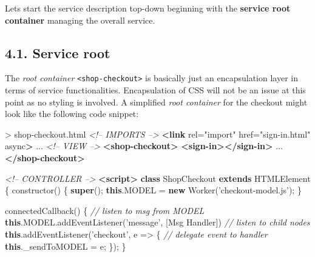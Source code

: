 \documentclass[]{article}
\newenvironment{Shaded}{}{}
\newcommand{\KeywordTok}[1]{\textcolor[rgb]{0.00,0.44,0.13}{\textbf{{#1}}}}
\newcommand{\StringTok}[1]{\textcolor[rgb]{0.25,0.44,0.63}{{#1}}}
\newcommand{\CommentTok}[1]{\textcolor[rgb]{0.38,0.63,0.69}{\textit{{#1}}}}
\newcommand{\OtherTok}[1]{\textcolor[rgb]{0.00,0.44,0.13}{{#1}}}
\newcommand{\VariableTok}[1]{\textcolor[rgb]{0.10,0.09,0.49}{{#1}}}
\newcommand{\OperatorTok}[1]{\textcolor[rgb]{0.40,0.40,0.40}{{#1}}}
\newcommand{\AttributeTok}[1]{\textcolor[rgb]{0.49,0.56,0.16}{{#1}}}
\newcommand{\NormalTok}[1]{{#1}}
\begin{document}
Lets start the service description top-down beginning with the
\textbf{service root container} managing the overall service.

\subsection{4.1. Service root}\label{service-root}

The \emph{root container}
\texttt{\textless{}shop-checkout\textgreater{}} is basically just an
encapsulation layer in terms of service functionalities. Encapsulation
of CSS will not be an issue at this point as no styling is involved. A
simplified \emph{root container} for the checkout might look like the
following code snippet:

\begin{Shaded}
\begin{Highlighting}[]
\NormalTok{> shop-checkout.html}
\CommentTok{<!-- IMPORTS -->}
\KeywordTok{<link}\OtherTok{ rel=}\StringTok{"import"}\OtherTok{ href=}\StringTok{"sign-in.html"}\OtherTok{ async}\KeywordTok{>}
\NormalTok{...}
\CommentTok{<!-- VIEW -->}
\KeywordTok{<shop-checkout>}
  \KeywordTok{<sign-in></sign-in>}
  \NormalTok{...}
\KeywordTok{</shop-checkout>}

\CommentTok{<!-- CONTROLLER -->}
\KeywordTok{<script>}
\KeywordTok{class} \NormalTok{ShopCheckout }\KeywordTok{extends} \NormalTok{HTMLElement }\OperatorTok{\{}
  \AttributeTok{constructor}\NormalTok{() }\OperatorTok{\{}
    \KeywordTok{super}\NormalTok{()}\OperatorTok{;}
    \KeywordTok{this}\NormalTok{.}\AttributeTok{MODEL} \OperatorTok{=} \KeywordTok{new} \AttributeTok{Worker}\NormalTok{(}\StringTok{'checkout-model.js'}\NormalTok{)}\OperatorTok{;}
  \OperatorTok{\}}
  
  \AttributeTok{connectedCallback}\NormalTok{() }\OperatorTok{\{}
    \CommentTok{// listen to msg from MODEL}
    \KeywordTok{this}\NormalTok{.}\VariableTok{MODEL}\NormalTok{.}\AttributeTok{addEventListener}\NormalTok{(}\StringTok{'message'}\OperatorTok{,} \NormalTok{[Msg Handler])}
    \CommentTok{// listen to child nodes}
    \KeywordTok{this}\NormalTok{.}\AttributeTok{addEventListener}\NormalTok{(}\StringTok{'checkout'}\OperatorTok{,} \NormalTok{e }\OperatorTok{=>} \OperatorTok{\{}
      \CommentTok{// delegate event to handler}
      \KeywordTok{this}\NormalTok{.}\AttributeTok{_sendToMODEL} \OperatorTok{=} \NormalTok{e}\OperatorTok{;} 
    \OperatorTok{\}}\NormalTok{)}\OperatorTok{;}
  \OperatorTok{\}}
  

\end{Highlighting}
\end{Shaded}
\end{document}
